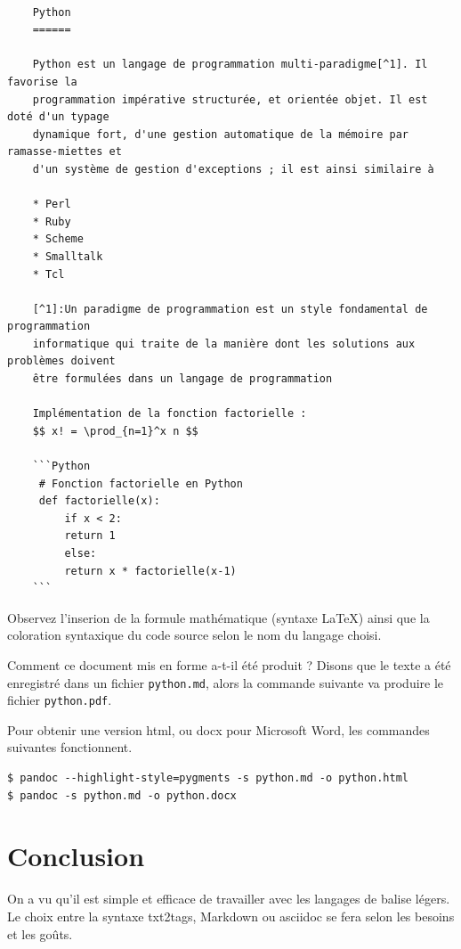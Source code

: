 \documentclass[]{article}
\newenvironment{Shaded}{}{}
\newcommand{\NormalTok}[1]{{#1}}
\begin{document}
\begin{verbatim}

    Python
    ======

    Python est un langage de programmation multi-paradigme[^1]. Il favorise la
    programmation impérative structurée, et orientée objet. Il est doté d'un typage
    dynamique fort, d'une gestion automatique de la mémoire par ramasse-miettes et
    d'un système de gestion d'exceptions ; il est ainsi similaire à 

    * Perl
    * Ruby
    * Scheme
    * Smalltalk
    * Tcl

    [^1]:Un paradigme de programmation est un style fondamental de programmation
    informatique qui traite de la manière dont les solutions aux problèmes doivent
    être formulées dans un langage de programmation

    Implémentation de la fonction factorielle :
    $$ x! = \prod_{n=1}^x n $$

    ```Python
     # Fonction factorielle en Python
     def factorielle(x):
         if x < 2:
         return 1
         else:
         return x * factorielle(x-1)
    ```
\end{verbatim}
Observez l'inserion de la formule mathématique (syntaxe LaTeX) ainsi que
la coloration syntaxique du code source selon le nom du langage choisi.

Comment ce document mis en forme a-t-il été produit ? Disons que le
texte a été enregistré dans un fichier \texttt{python.md}, alors la
commande suivante va produire le fichier \texttt{python.pdf}.

\begin{Shaded}
\end{Shaded}
Pour obtenir une version html, ou docx pour Microsoft Word, les
commandes suivantes fonctionnent.

\begin{verbatim}
$ pandoc --highlight-style=pygments -s python.md -o python.html
$ pandoc -s python.md -o python.docx
\end{verbatim}
\section{Conclusion}

On a vu qu'il est simple et efficace de travailler avec les langages de
balise légers. Le choix entre la syntaxe txt2tags, Markdown ou asciidoc
se fera selon les besoins et les goûts.
\end{document}
